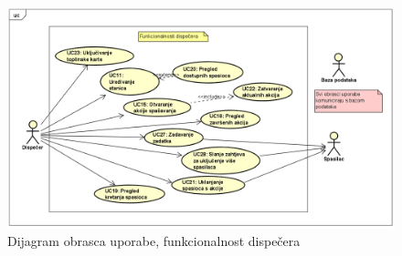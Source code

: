 				\begin{figure}[h!]
					\centering
					\includegraphics[width=\textwidth]{./slike/Dispecer.png}
					\caption{Dijagram obrasca uporabe, funkcionalnost dispečera}
					
				\end{figure}
			
				\cleardoublepage
				

